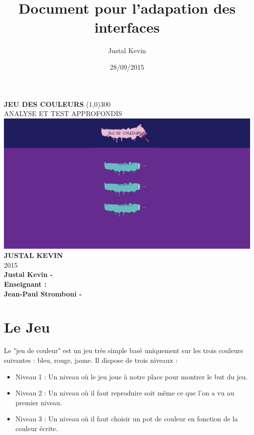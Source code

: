 \documentclass{article}
\title{Document pour l'adapation des interfaces}
\author{Justal Kevin}
\date{28/09/2015}
\begin{document}
\begin{center}
\textbf{\Huge{JEU DES COULEURS}}
\line(1,0){300}\\
ANALYSE ET TEST APPROFONDIS\\
\vspace{3cm}
\includegraphics[width=\textwidth]{2}\\
\vspace{3cm}
\textbf{\Large{JUSTAL KEVIN}}\\
2015\\
\vspace{2cm}
\textbf{Justal Kevin -  \color{black}{- SI5 - IHM}}\\
\vspace{4cm}
\textbf{Enseignant :}\\
\textbf{Jean-Paul Stromboni - }
\end{center}

\newpage
\tableofcontents

\newpage

\section{Le Jeu}

Le "jeu de couleur" est un jeu très simple basé uniquement sur les trois couleurs suivantes : bleu, rouge, jaune. Il dispose de trois niveaux :\\
\begin{itemize}
\item Niveau 1 : Un niveau où le jeu joue à notre place pour montrer le but du jeu.
\item Niveau 2 : Un niveau où il faut reproduire soit même ce que l'on a vu au premier niveau.
\item Niveau 3 : Un niveau où il faut choisir un pot de couleur en fonction de la couleur écrite.
\end{itemize}
\vspace{0.4cm}
\end{document}
